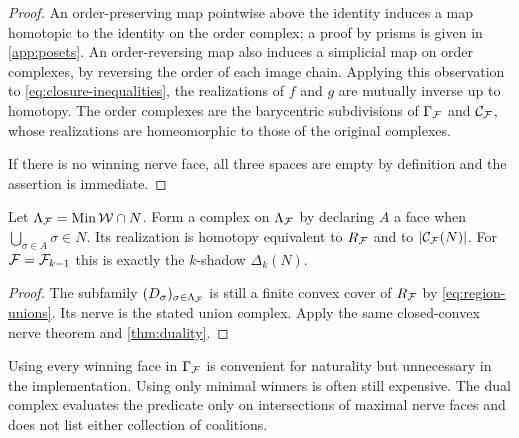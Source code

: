 \begin{proof}
An order-preserving map pointwise above the identity induces a map homotopic to the identity on the order complex; a proof by prisms is given in \cref{app:posets}. An order-reversing map also induces a simplicial map on order complexes, by reversing the order of each image chain. Applying this observation to \cref{eq:closure-inequalities}, the realizations of $f$ and $g$ are mutually inverse up to homotopy. The order complexes are the barycentric subdivisions of $\Gamma_{\mathcal F}$ and $\mathcal C_{\mathcal F}$, whose realizations are homeomorphic to those of the original complexes.

If there is no winning nerve face, all three spaces are empty by definition and the assertion is immediate.
\end{proof}

\begin{corollary}\label{cor:minimal}
Let $\Lambda_{\mathcal F}=\operatorname{Min}\mathcal W\cap N$. Form a complex on $\Lambda_{\mathcal F}$ by declaring $A$ a face when $\bigcup_{\sigma\in A}\sigma\in N$. Its realization is homotopy equivalent to $R_{\mathcal F}$ and to $\left|\mathcal C_{\mathcal F}(N)\right|$. For $\mathcal F=\mathcal F_{k-1}$ this is exactly the $k$-shadow $\Delta_k(N)$.
\end{corollary}
\begin{proof}
The subfamily $(D_\sigma)_{\sigma\in\Lambda_{\mathcal F}}$ is still a finite convex cover of $R_{\mathcal F}$ by \cref{eq:region-unions}. Its nerve is the stated union complex. Apply the same closed-convex nerve theorem and \cref{thm:duality}.
\end{proof}

Using every winning face in $\Gamma_{\mathcal F}$ is convenient for naturality but unnecessary in the implementation. Using only minimal winners is often still expensive. The dual complex evaluates the predicate only on intersections of maximal nerve faces and does not list either collection of coalitions.

